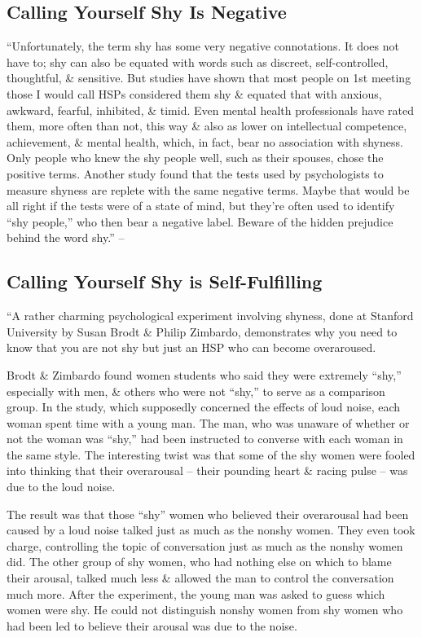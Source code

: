 \documentclass{article}
\numberwithin{equation}{section}
\begin{document}
\subsection{Calling Yourself Shy Is Negative}
``Unfortunately, the term shy has some very negative connotations. It does not have to; shy can also be equated with words such as discreet, self-controlled, thoughtful, \& sensitive. But studies have shown that most people on 1st meeting those I would call HSPs considered them shy \& equated that with anxious, awkward, fearful, inhibited, \& timid. Even mental health professionals have rated them, more often than not, this way \& also as lower on intellectual competence, achievement, \& mental health, which, in fact, bear no association with shyness. Only people who knew the shy people well, such as their spouses, chose the positive terms. Another study found that the tests used by psychologists to measure shyness are replete with the same negative terms. Maybe that would be all right if the tests were of a state of mind, but they're often used to identify ``shy people,'' who then bear a negative label. Beware of the hidden prejudice behind the word shy.'' -- \cite[p. 125]{Aron2013}

\subsection{Calling Yourself Shy is Self-Fulfilling}
``A rather charming psychological experiment involving shyness, done at Stanford University by Susan Brodt \& Philip Zimbardo, demonstrates why you need to know that you are not shy but just an HSP who can become overaroused.

Brodt \& Zimbardo found women students who said they were extremely ``shy,'' especially with men, \& others who were not ``shy,'' to serve as a comparison group. In the study, which supposedly concerned the effects of loud noise, each woman spent time with a young man. The man, who was unaware of whether or not the woman was ``shy,'' had been instructed to converse with each woman in the same style. The interesting twist was that some of the shy women were fooled into thinking that their overarousal -- their pounding heart \& racing pulse -- was due to the loud noise.

The result was that those ``shy'' women who believed their overarousal had been caused by a loud noise talked just as much as the nonshy women. They even took charge, controlling the topic of conversation just as much as the nonshy women did. The other group of shy women, who had nothing else on which to blame their arousal, talked much less \& allowed the man to control the conversation much more. After the experiment, the young man was asked to guess which women were shy. He could not distinguish nonshy women from shy women who had been led to believe their arousal was due to the noise.
\end{document}
